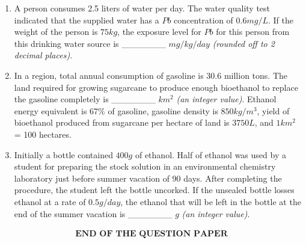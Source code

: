\documentclass[journal]{IEEEtran}
\begin{document}
\begin{enumerate}
\item A person consumes 2.5 liters of water per day. The water quality test indicated that the supplied water has a $Pb$ concentration of $0.6 mg/L$. If the weight of the person is $75 kg$, the exposure level for $Pb$ for this person from this drinking water source is \_\_\_\_\_\_\_ $mg/kg/day$ \textit{(rounded off to 2 decimal places)}.
\hfill{}

\item In a region, total annual consumption of gasoline is 30.6 million tons. The land required for growing sugarcane to produce enough bioethanol to replace the gasoline completely is \_\_\_\_\_\_\_ $km^2$ \textit{(an integer value)}.
Ethanol energy equivalent is 67\% of gasoline, gasoline density is $850 kg/m^3$, yield of bioethanol produced from sugarcane per hectare of land is $3750 L$, and $1 km^2$ = 100 hectares.
\hfill{}

\item Initially a bottle contained $400 g$ of ethanol. Half of ethanol was used by a student for preparing the stock solution in an environmental chemistry laboratory just before summer vacation of 90 days. After completing the procedure, the student left the bottle uncorked. If the unsealed bottle losses ethanol at a rate of $0.5 g/day$, the ethanol that will be left in the bottle at the end of the summer vacation is \_\_\_\_\_\_\_ $g$ \textit{(an integer value)}.
\hfill{}
\end{enumerate}
\bigskip

\begin{align}
\textbf{END OF THE QUESTION PAPER}
\end{align}
\end{document}
